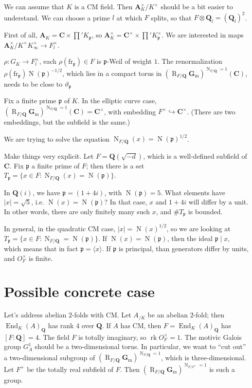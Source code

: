 \documentclass{article}
\DeclareMathOperator{\End}{End}
\DeclareMathOperator{\N}{N}
\DeclareMathOperator{\rk}{rk}
\DeclareMathOperator{\R}{R}
\newcommand{\bA}{\mathbf{A}}
\newcommand{\bC}{\mathbf{C}}
\newcommand{\bQ}{\mathbf{Q}}
\newcommand{\fp}{\mathfrak{p}}
\newcommand{\frob}{\mathrm{fr}}
\newcommand{\Gm}{\mathbf{G}_\mathrm{m}}
\begin{document}
We can assume that $K$ is a CM field. Then $\bA_K^\times / K^\times$ should 
be a bit easier to understand. We can choose a prime $l$ at which $F$ splits, 
so that $F\otimes \bQ_l = (\bQ_l)^2$. 

First of all, $\bA_K = \bC \times \prod' K_\fp$, so 
$\bA_K^\times = \bC^\times \times \prod' K_\fp^\times$. We are interested in 
maps $\bA_K^\times / K^\times K_\infty^\times \to F_l^\times$. 

$\rho\colon G_K \to F_l^\times$, each $\rho(\frob_\fp)\in F$ is $\fp$-Weil of 
weight $1$. The renormalization $\rho(\frob_\fp) \N(\fp)^{-1/2}$, which lies 
in a compact torus in $(\R_{F/\bQ}\Gm)^{\N_{F/\bQ} = 1}(\bC)$, needs to be 
close to $\vartheta_\fp$

Fix a finite prime $\fp$ of $K$. In the elliptic curve case, 
$(\R_{F/\bQ}\Gm)^{\N_{F/\bQ} = 1}(\bC) = \bC^\times$, with embedding 
$F^\times\hookrightarrow \bC^\times$. (There are two embeddings, but the 
subfield is the same.) 

We are trying to solve the equation $\N_{F/\bQ}(x) = \N(\fp)^{1/2}$. 

Make things very explicit. Let $F = \bQ(\sqrt{-d})$, which is a 
well-defined subfield of $\bC$. Fix $\fp$ a finite prime of $F$; then there 
is a set $T_\fp = \{x\in F : \N_{F/\bQ}(x) = \N(\fp)\}$. 

In $\bQ(i)$, we have $\fp = (1 + 4 i)$, with $\N(\fp) = 5$. What elements have 
$|x| = \sqrt 5$, i.e. $\N(x) = \N(\fp)$? In that case, $x$ and $1+4 i$ will 
differ by a unit. In other words, there are only finitely many such $x$, and 
$\# T_\fp$ is bounded. 

In general, in the quadratic CM case, $|x| = \N(x)^{1/2}$, so we are looking 
at $T_\fp = \{x\in F : \N_{F/\bQ} = \N(\fp)\}$. If $\N(x) = \N(\fp)$, then the 
ideal $\fp\mid x$, which means that in fact $\fp = \langle x\rangle$. If $\fp$ 
is principal, than generators differ by units, and $O_F^\times$ is finite. 





\section{Possible concrete case}

Let's address abelian $2$-folds with CM. Let $A_{/K}$ be an abelian $2$-fold; 
then $\End_K(A)_\bQ$ has rank $4$ over $\bQ$. If $A$ has CM, then 
$F = \End_K(A)_\bQ$ has $[F:\bQ] = 4$. The field $F$ is totally imaginary, so 
$\rk O_F^\times = 1$. The motivic Galois group $G_A^1$ should be a 
two-dimensional torus. In particular, we want to ``cut out'' a two-dimensional 
subgroup of $(\R_{F/\bQ} \Gm)^{\N_{F/\bQ} = 1}$, which is three-dimensional. 
Let $F^+$ be the totally real subfield of $F$. Then 
$(\R_{F/\bQ} \Gm)^{\N_{F/F^+} = 1}$ is such a group. 
\end{document}
